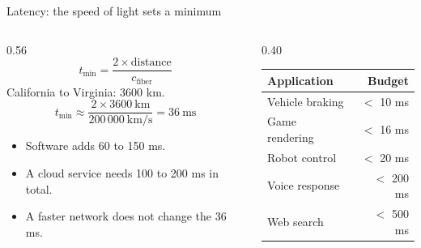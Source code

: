 \begin{frame}{Latency: the speed of light sets a minimum}
  \begin{columns}[T]
    \begin{column}{0.56\textwidth}
      \[
        t_{\min} = \frac{2 \times \text{distance}}{c_{\text{fiber}}}
      \]
      California to Virginia: 3600 km.
      \[
        t_{\min} \approx \frac{2 \times 3600\ \text{km}}{200\,000\ \text{km/s}}
                 = 36\ \text{ms}
      \]
      \begin{itemize}
        \item Software adds 60 to 150 ms.
        \item A cloud service needs 100 to 200 ms in total.
        \item A faster network does not change the 36 ms.
      \end{itemize}
    \end{column}
    \begin{column}{0.40\textwidth}
      \small
      \renewcommand{\arraystretch}{1.2}
      \begin{tabular}{@{}lr@{}}
        \toprule
        \textbf{Application} & \textbf{Budget} \\
        \midrule
        Vehicle braking & $<$ 10 ms \\
        Game rendering  & $<$ 16 ms \\
        Robot control   & $<$ 20 ms \\
        Voice response  & $<$ 200 ms \\
        Web search      & $<$ 500 ms \\
        \bottomrule
      \end{tabular}
    \end{column}
  \end{columns}
\end{frame}

